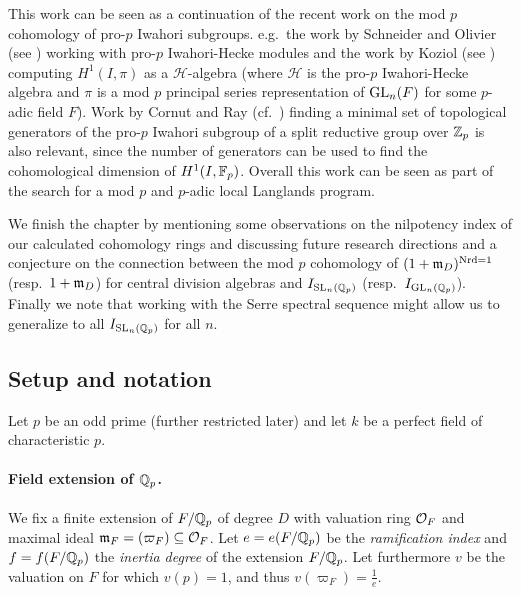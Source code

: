 This work can be seen as a continuation of the recent work on the mod $p$ cohomology of pro-$p$ Iwahori subgroups. e.g.\ the work by Schneider and Olivier (see \cite{SchOll-modular,SchOll-torsion,Sch-smooth}) working with pro-$p$ Iwahori-Hecke modules and the work by Koziol (see \cite{Koziol}) computing $H^{1}(I,\pi)$ as a $\mathcal{H}$-algebra (where $\mathcal{H}$ is the pro-$p$ Iwahori-Hecke algebra and $\pi$ is a mod $p$ principal series representation of $\operatorname{GL}_{n}(F)$ for some $p$-adic field $F$). Work by Cornut and Ray (cf.\ \cite{Generators}) finding a minimal set of topological generators of the pro-$p$ Iwahori subgroup of a split reductive group over $\mathbb{Z}_{p}$ is also relevant, since the number of generators can be used to find the cohomological dimension of $H^{1}(I,\mathbb{F}_{p})$. Overall this work can be seen as part of the search for a mod $p$ and $p$-adic local Langlands program.

We finish the chapter by mentioning some observations on the nilpotency index of our calculated cohomology rings and discussing future research directions and a conjecture on the connection between the mod $p$ cohomology of $(1+\mathfrak{m}_{D})^{\operatorname{Nrd} = 1}$ (resp.\ $1+\mathfrak{m}_{D}$) for central division algebras and $I_{\operatorname{SL}_{n}(\mathbb{Q}_{p})}$ (resp.\ $I_{\operatorname{GL}_{n}(\mathbb{Q}_{p})}$). Finally we note that working with the Serre spectral sequence might allow us to generalize to all $I_{\operatorname{SL}_{n}(\mathbb{Q}_{p})}$ for all $n$.


\subsection{Setup and notation}%
\label{subsec:setup-iwa}

Let $p$ be an odd prime (further restricted later) and let $k$ be a perfect field of characteristic $p$.

\paragraph{Field extension of $\mathbb{Q}_{p}$.} We fix a finite extension of $F/\mathbb{Q}_{p}$ of degree $D$ with valuation ring $\mathcal{O}_{F}$ and maximal ideal $\mathfrak{m}_{F} = (\varpi_{F}) \subseteq \mathcal{O}_{F}$. Let $e = e(F/\mathbb{Q}_{p})$ be the \emph{ramification index} and $f = f(F/\mathbb{Q}_{p})$ the \emph{inertia degree} of the extension $F/\mathbb{Q}_{p}$. Let furthermore $v$ be the valuation on $F$ for which $v(p) = 1$, and thus $v(\varpi_{F}) = \frac{1}{e}$.

